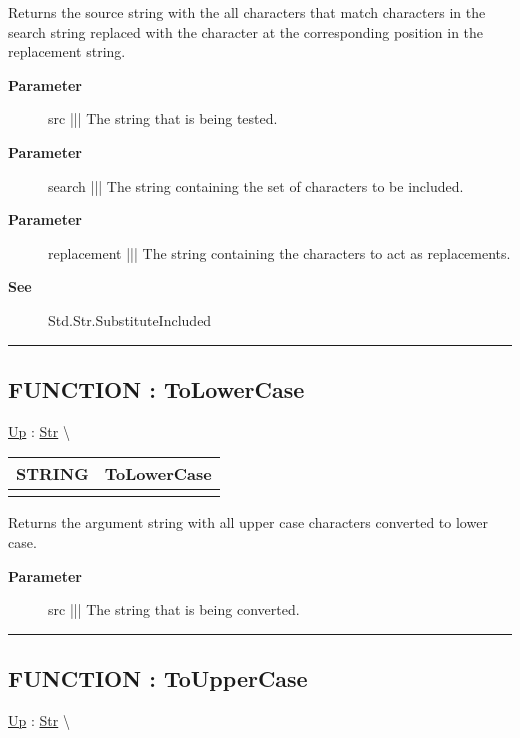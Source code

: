 \par
Returns the source string with the all characters that match characters in the search string replaced with the character at the corresponding position in the replacement string.

\par
\begin{description}
\item [\textbf{Parameter}] src ||| The string that is being tested.
\item [\textbf{Parameter}] search ||| The string containing the set of characters to be included.
\item [\textbf{Parameter}] replacement ||| The string containing the characters to act as replacements.
\item [\textbf{See}] Std.Str.SubstituteIncluded
\end{description}

\rule{\linewidth}{0.5pt}
\subsection*{FUNCTION : ToLowerCase}
\hypertarget{ecldoc:str.tolowercase}{}
\hyperlink{ecldoc:Str}{Up} :
\hspace{0pt} \hyperlink{ecldoc:Str}{Str} \textbackslash 

{\renewcommand{\arraystretch}{1.5}
\begin{tabularx}{\textwidth}{|>{\raggedright\arraybackslash}l|X|}
\hline
\hspace{0pt}STRING & ToLowerCase \\
\hline
\multicolumn{2}{|>{\raggedright\arraybackslash}X|}{\hspace{0pt}(STRING src)} \\
\hline
\end{tabularx}
}

\par
Returns the argument string with all upper case characters converted to lower case.

\par
\begin{description}
\item [\textbf{Parameter}] src ||| The string that is being converted.
\end{description}

\rule{\linewidth}{0.5pt}
\subsection*{FUNCTION : ToUpperCase}
\hypertarget{ecldoc:str.touppercase}{}
\hyperlink{ecldoc:Str}{Up} :
\hspace{0pt} \hyperlink{ecldoc:Str}{Str} \textbackslash 


